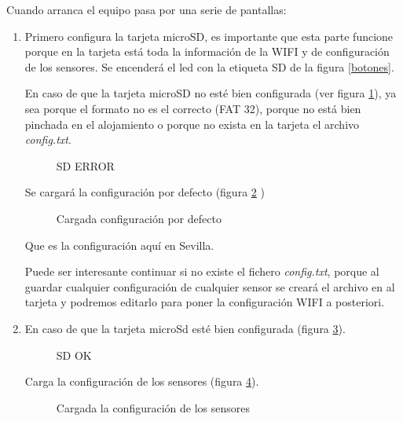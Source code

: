 Cuando arranca el equipo pasa por una serie de pantallas:
\begin{enumerate}
\item Primero configura la tarjeta microSD, es importante que esta parte funcione porque en la tarjeta está toda la información de la WIFI y de configuración de los sensores. Se encenderá el led con la etiqueta SD de la figura \ref{botones}.

En caso de que la tarjeta microSD no esté bien configurada (ver figura \ref{patalla:Nosd}), ya sea porque el formato no es el correcto (FAT 32), porque no está bien pinchada en el alojamiento o porque no exista en la tarjeta el archivo \emph{config.txt}. 

\begin{figure}[htbp!] 
\caption{SD ERROR}\label{patalla:Nosd} 
\end{figure}

Se cargará la configuración por defecto (figura \ref{patalla:condef} )  

\begin{figure}[htbp!] 
\caption{Cargada configuración por defecto}\label{patalla:condef} 
\end{figure}

Que es la configuración aquí en Sevilla.

Puede ser interesante continuar si no existe el fichero \emph{config.txt}, porque al guardar cualquier configuración de cualquier sensor se creará el archivo en al tarjeta y podremos editarlo para poner la configuración WIFI a posteriori.


\item En caso de que la tarjeta microSd esté bien configurada (figura \ref{patalla:sd}). 

\begin{figure}[htbp!] 
\caption{SD OK}\label{patalla:sd} 
\end{figure}

Carga la configuración de los sensores (figura \ref{patalla:SenOk}).

\begin{figure}[htbp!] 
\caption{Cargada la configuración de los sensores}\label{patalla:SenOk} 
\end{figure}


\end{enumerate}
